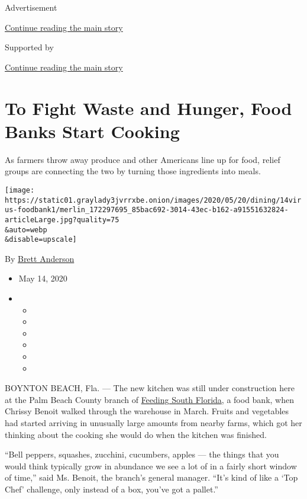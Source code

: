 Advertisement

\protect\hyperlink{after-top}{Continue reading the main story}

Supported by

\protect\hyperlink{after-sponsor}{Continue reading the main story}

\hypertarget{to-fight-waste-and-hunger-food-banks-start-cooking}{%
\section{To Fight Waste and Hunger, Food Banks Start
Cooking}\label{to-fight-waste-and-hunger-food-banks-start-cooking}}

As farmers throw away produce and other Americans line up for food,
relief groups are connecting the two by turning those ingredients into
meals.

\texttt{[image: https://static01.graylady3jvrrxbe.onion/images/2020/05/20/dining/14virus-foodbank1/merlin\_172297695\_85bac692-3014-43ec-b162-a91551632824-articleLarge.jpg?quality=75\\\&auto=webp\\\&disable=upscale]}

By \href{https://www.nytimes3xbfgragh.onion/by/brett-anderson}{Brett
Anderson}

\begin{itemize}
\item
  May 14, 2020
\item
  \begin{itemize}
  \item
  \item
  \item
  \item
  \item
  \item
  \end{itemize}
\end{itemize}

BOYNTON BEACH, Fla. --- The new kitchen was still under construction
here at the Palm Beach County branch of
\href{https://feedingsouthflorida.org/}{Feeding South Florida}, a food
bank, when Chrissy Benoit walked through the warehouse in March. Fruits
and vegetables had started arriving in unusually large amounts from
nearby farms, which got her thinking about the cooking she would do when
the kitchen was finished.

``Bell peppers, squashes, zucchini, cucumbers, apples --- the things
that you would think typically grow in abundance we see a lot of in a
fairly short window of time,'' said Ms. Benoit, the branch's general
manager. ``It's kind of like a `Top Chef' challenge, only instead of a
box, you've got a pallet.''

